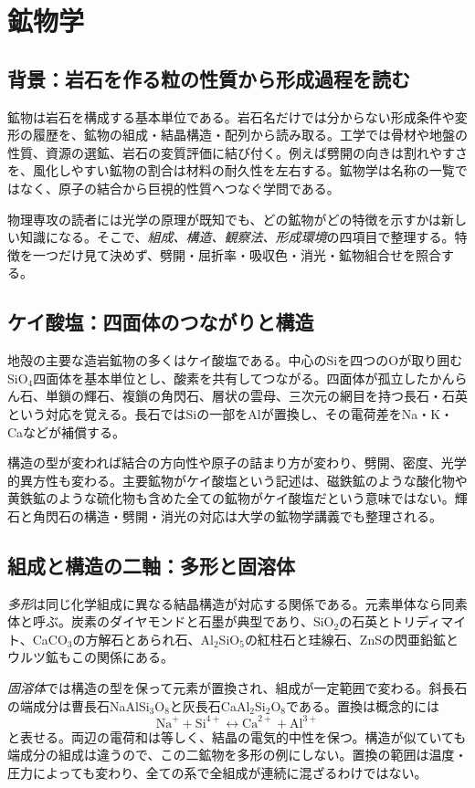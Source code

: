 \chapter{鉱物学}
\section{背景：岩石を作る粒の性質から形成過程を読む}
鉱物は岩石を構成する基本単位である。岩石名だけでは分からない形成条件や変形の履歴を、鉱物の組成・結晶構造・配列から読み取る。工学では骨材や地盤の性質、資源の選鉱、岩石の変質評価に結び付く。例えば劈開の向きは割れやすさを、風化しやすい鉱物の割合は材料の耐久性を左右する。鉱物学は名称の一覧ではなく、原子の結合から巨視的性質へつなぐ学問である。

物理専攻の読者には光学の原理が既知でも、どの鉱物がどの特徴を示すかは新しい知識になる。そこで、\emph{組成、構造、観察法、形成環境}の四項目で整理する。特徴を一つだけ見て決めず、劈開・屈折率・吸収色・消光・鉱物組合せを照合する。

\section{ケイ酸塩：四面体のつながりと構造}
\label{theory:mineral:structure}
地殻の主要な造岩鉱物の多くはケイ酸塩である。中心のSiを四つのOが取り囲むSiO$_4$四面体を基本単位とし、酸素を共有してつながる。四面体が孤立したかんらん石、単鎖の輝石、複鎖の角閃石、層状の雲母、三次元の網目を持つ長石・石英という対応を覚える。長石ではSiの一部をAlが置換し、その電荷差をNa・K・Caなどが補償する。

構造の型が変われば結合の方向性や原子の詰まり方が変わり、劈開、密度、光学的異方性も変わる。主要鉱物がケイ酸塩という記述は、磁鉄鉱のような酸化物や黄鉄鉱のような硫化物も含めた全ての鉱物がケイ酸塩だという意味ではない。輝石と角閃石の構造・劈開・消光の対応は大学の鉱物学講義でも整理される\parencite{nelson_inosilicates}。

\section{組成と構造の二軸：多形と固溶体}
\label{theory:mineral:composition}
\emph{多形}は同じ化学組成に異なる結晶構造が対応する関係である。元素単体なら同素体と呼ぶ。炭素のダイヤモンドと石墨が典型であり、SiO$_2$の石英とトリディマイト、CaCO$_3$の方解石とあられ石、Al$_2$SiO$_5$の紅柱石と珪線石、ZnSの閃亜鉛鉱とウルツ鉱もこの関係にある\parencite{hom_quartz,hom_calcite,hom_andalusite,hom_sphalerite}。

\emph{固溶体}では構造の型を保って元素が置換され、組成が一定範囲で変わる。斜長石の端成分は曹長石NaAlSi$_3$O$_8$と灰長石CaAl$_2$Si$_2$O$_8$である\parencite{hom_albite,hom_anorthite}。置換は概念的には
\[
 \mathrm{Na}^{+}+\mathrm{Si}^{4+}
 \longleftrightarrow \mathrm{Ca}^{2+}+\mathrm{Al}^{3+}
\]
と表せる。両辺の電荷和は等しく、結晶の電気的中性を保つ。構造が似ていても端成分の組成は違うので、この二鉱物を多形の例にしない。置換の範囲は温度・圧力によっても変わり、全ての系で全組成が連続に混ざるわけではない。

